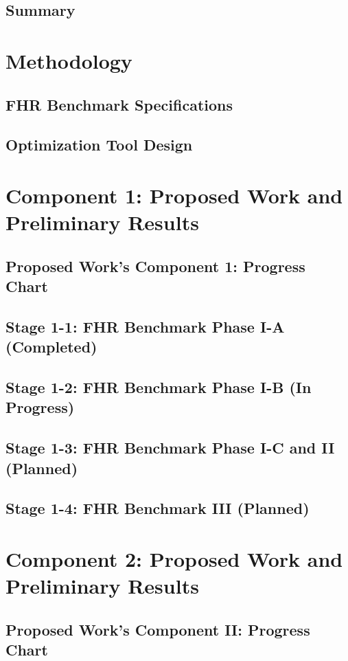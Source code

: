 \documentclass[9pt]{beamer}
\begin{document}
\subsection{Summary}


\section{Methodology}
\subsection{FHR Benchmark Specifications}

\subsection{Optimization Tool Design}


\section{Component 1: Proposed Work and Preliminary Results}
\subsection{Proposed Work's Component 1: Progress Chart}

\subsection{Stage 1-1: FHR Benchmark Phase I-A (Completed)}

\subsection{Stage 1-2: FHR Benchmark Phase I-B (In Progress)}

\subsection{Stage 1-3: FHR Benchmark Phase I-C and II (Planned)}

\subsection{Stage 1-4: FHR Benchmark III (Planned)}


\section{Component 2: Proposed Work and Preliminary Results}
\subsection{Proposed Work's Component II: Progress Chart}

\end{document}
